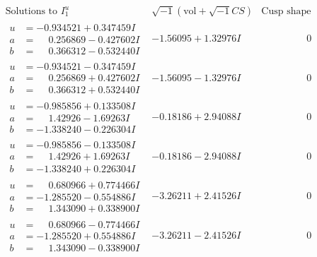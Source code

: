 \documentclass[1p]{elsarticle_modified}
\theoremstyle{definition}
\newcommand{\I}{\sqrt{-1}}
\begin{document}
$$\begin{array}{c|c|c}  
\text{Solutions to }I^u_{1}& \I (\text{vol} + \sqrt{-1}CS) & \text{Cusp shape}\\
 \hline 
\begin{aligned}
u &= -0.934521 + 0.347459 I \\
a &= \phantom{-}0.256869 - 0.427602 I \\
b &= \phantom{-}0.366312 - 0.532440 I\end{aligned}
 & -1.56095 + 1.32976 I & \phantom{-0.000000 } 0 \\ \hline\begin{aligned}
u &= -0.934521 - 0.347459 I \\
a &= \phantom{-}0.256869 + 0.427602 I \\
b &= \phantom{-}0.366312 + 0.532440 I\end{aligned}
 & -1.56095 - 1.32976 I & \phantom{-0.000000 } 0 \\ \hline\begin{aligned}
u &= -0.985856 + 0.133508 I \\
a &= \phantom{-}1.42926 - 1.69263 I \\
b &= -1.338240 - 0.226304 I\end{aligned}
 & -0.18186 + 2.94088 I & \phantom{-0.000000 } 0 \\ \hline\begin{aligned}
u &= -0.985856 - 0.133508 I \\
a &= \phantom{-}1.42926 + 1.69263 I \\
b &= -1.338240 + 0.226304 I\end{aligned}
 & -0.18186 - 2.94088 I & \phantom{-0.000000 } 0 \\ \hline\begin{aligned}
u &= \phantom{-}0.680966 + 0.774466 I \\
a &= -1.285520 - 0.554886 I \\
b &= \phantom{-}1.343090 + 0.338900 I\end{aligned}
 & -3.26211 + 2.41526 I & \phantom{-0.000000 } 0 \\ \hline\begin{aligned}
u &= \phantom{-}0.680966 - 0.774466 I \\
a &= -1.285520 + 0.554886 I \\
b &= \phantom{-}1.343090 - 0.338900 I\end{aligned}
 & -3.26211 - 2.41526 I & \phantom{-0.000000 } 0 \\ \hline\begin{aligned}

\end{aligned}
\end{array}$$
\end{document}
